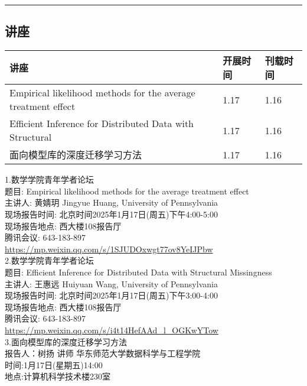 \documentclass[letterpaper, 12pt]{article}
\begin{document}
\hrule
\pagebreak
\begin{multicols}{2}

\section{讲座}
\begin{tabularx}{0.5\textwidth}{|X|X|X|}
    \hline
    讲座 & 开展时间 & 刊载时间\\
    \hline\hline
Empirical likelihood methods for the average treatment effect & 1.17 & 1.16\\\hline
Efficient Inference for Distributed Data with Structural & 1.17 & 1.16\\\hline
面向模型库的深度迁移学习方法 & 1.17 & 1.16\\\hline
\end{tabularx}

1.数学学院青年学者论坛\\
题目: Empirical likelihood methods for the average treatment effect\\
主讲人: 黄婧玥 Jingyue Huang, University of Pennsylvania\\
现场报告时间: 北京时间2025年1月17日(周五)下午4:00-5:00\\
现场报告地点: 西大楼108报告厅\\
腾讯会议: 643-183-897\\
\url{https://mp.weixin.qq.com/s/1SJUDOxwgt77ov8YeIJPbw}\\

2.数学学院青年学者论坛\\
题目: Efficient Inference for Distributed Data with Structural Missingness\\
主讲人: 王惠远 Huiyuan Wang, University of Pennsylvania\\
现场报告时间: 北京时间2025年1月17日(周五)下午3:00-4:00\\
现场报告地点: 西大楼108报告厅\\
腾讯会议: 643-183-897\\
\url{https://mp.weixin.qq.com/s/i4t14HefAAd_l_OGKwYTow}\\

3.面向模型库的深度迁移学习方法\\
报告人：树扬 讲师 华东师范大学数据科学与工程学院\\
时间:1月17日(星期五)14:00\\
地点:计算机科学技术楼230室\\



\end{multicols}
\end{document}
